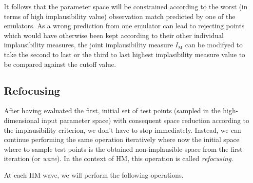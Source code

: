 \noindent
It follows that the parameter space will be constrained according to the worst (in terms of high implausibility value) observation match predicted by one of the emulators. As a wrong prediction from one emulator can lead to rejecting points which would have otherwise been kept according to their other individual implausibility measures, the joint implausibility measure $I_{\text{M}}$ can be modifyed to take the second to last or the third to last highest implasibility measure value to be compared against the cutoff value.


%
%
%
\subsection{Refocusing}\label{sec:ch3refocusing}
After having evaluated the first, initial set of test points (sampled in the high-dimensional input parameter space) with consequent space reduction according to the implausibility criterion, we don't have to stop immediately. Instead, we can continue performing the same operation iteratively where now the initial space where to sample test points is the obtained non-implausible space from the first iteration (or \textit{wave}). In the context of HM, this operation is called \textit{refocusing}.

\vspace{0.2cm}\noindent
At each HM wave, we will perform the following operations.

